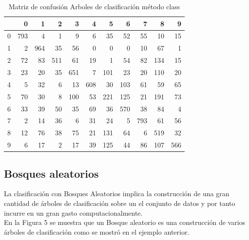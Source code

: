\documentclass{article}
\begin{document}
\begin{table}[H]
\caption{\small{Matriz de confusión Arboles de clasificación método class}}
\centering
\begin{tabular}{r|rrrrrrrrrr}
  \hline
 & 0 & 1 & 2 & 3 & 4 & 5 & 6 & 7 & 8 & 9 \\ 
  \hline
0 & 793 &   4 &   1 &   9 &   6 &  35 &  52 &  55 &  10 &  15 \\ 
  1 &   2 & 964 &  35 &  56 &   0 &   0 &   0 &  10 &  67 &   1 \\ 
  2 &  72 &  83 & 511 &  61 &  19 &   1 &  54 &  82 & 134 &  15 \\ 
  3 &  23 &  20 &  35 & 651 &   7 & 101 &  23 &  20 & 110 &  20 \\ 
  4 &   5 &  32 &   6 &  13 & 608 &  30 & 103 &  61 &  59 &  65 \\ 
  5 &  70 &  30 &   8 & 100 &  53 & 221 & 125 &  21 & 191 &  73 \\ 
  6 &  33 &  39 &  50 &  35 &  69 &  36 & 570 &  38 &  84 &   4 \\ 
  7 &   2 &  14 &  36 &   6 &  31 &  24 &   5 & 793 &  61 &  56 \\ 
  8 &  12 &  76 &  38 &  75 &  21 & 131 &  64 &   6 & 519 &  32 \\ 
  9 &   6 &  17 &   2 &  17 &  39 & 125 &  44 &  86 & 107 & 566 \\ 
   \hline
\end{tabular}
\end{table}







\subsection{Bosques aleatorios}

La clasificación con Bosques Aleatorios implica la construcción de una gran cantidad de árboles de clasificación sobre un el conjunto de datos y por tanto incurre en un gran gasto computacionalmente.\\

En la Figura 5 se muestra que un Bosque aleatorio es una construcción de varios árboles de clasificación como se mostró en el ejemplo anterior.
\end{document}
